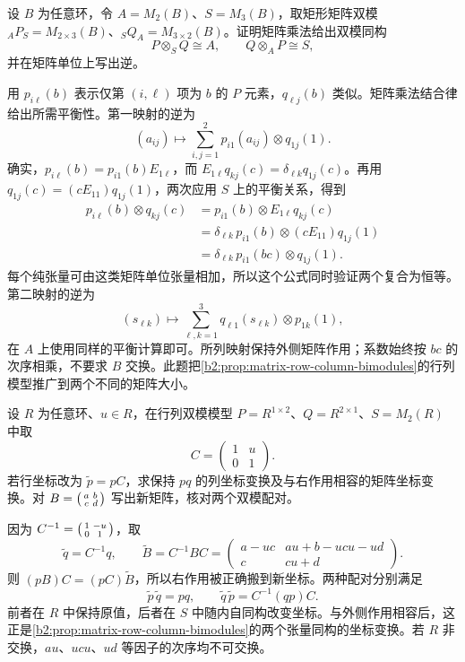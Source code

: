 \begin{exercise}\label{b2:ex:16-row-column-evaluation}
	设 \(B\) 为任意环，令 \(A=M_2(B)\)、\(S=M_3(B)\)，取矩形矩阵双模 \({}_AP_S=M_{2\times3}(B)\)、\({}_SQ_A=M_{3\times2}(B)\)。证明矩阵乘法给出双模同构
	\[
		P\otimes_SQ\cong A,\qquad Q\otimes_AP\cong S,
	\]
	并在矩阵单位上写出逆。
\end{exercise}
\begin{solution}
	用 \(p_{i\ell}(b)\) 表示仅第 \((i,\ell)\) 项为 \(b\) 的 \(P\) 元素，\(q_{\ell j}(b)\) 类似。矩阵乘法结合律给出所需平衡性。第一映射的逆为
	\[
		(a_{ij})\longmapsto\sum_{i,j=1}^2p_{i1}(a_{ij})\otimes q_{1j}(1).
	\]
	确实，\(p_{i\ell}(b)=p_{i1}(b)E_{1\ell}\)，而 \(E_{1\ell}q_{kj}(c)=\delta_{\ell k}q_{1j}(c)\)。再用 \(q_{1j}(c)=(cE_{11})q_{1j}(1)\)，两次应用 \(S\) 上的平衡关系，得到
	\[
		\begin{aligned}
			p_{i\ell}(b)\otimes q_{kj}(c) &=p_{i1}(b)\otimes E_{1\ell}q_{kj}(c)\\
			&=\delta_{\ell k}\,p_{i1}(b)\otimes(cE_{11})q_{1j}(1)\\
			&=\delta_{\ell k}\,p_{i1}(bc)\otimes q_{1j}(1).
		\end{aligned}
	\]
	每个纯张量可由这类矩阵单位张量相加，所以这个公式同时验证两个复合为恒等。第二映射的逆为
	\[
		(s_{\ell k})\longmapsto\sum_{\ell,k=1}^3q_{\ell1}(s_{\ell k})\otimes p_{1k}(1),
	\]
	在 \(A\) 上使用同样的平衡计算即可。所列映射保持外侧矩阵作用；系数始终按 \(bc\) 的次序相乘，不要求 \(B\) 交换。此题把\cref{b2:prop:matrix-row-column-bimodules}的行列模型推广到两个不同的矩阵大小。
\end{solution}

\begin{exercise}\label{b2:ex:16-dual-bimodule-pair}
	设 \(R\) 为任意环、\(u\in R\)，在行列双模模型 \(P=R^{1\times2}\)、\(Q=R^{2\times1}\)、\(S=M_2(R)\) 中取
	\[
		C=\begin{pmatrix}1&u\\0&1\end{pmatrix}.
	\]
	若行坐标改为 \(\widetilde p=pC\)，求保持 \(pq\) 的列坐标变换及与右作用相容的矩阵坐标变换。对 \(B=\begin{psmallmatrix}a&b\\c&d\end{psmallmatrix}\) 写出新矩阵，核对两个双模配对。
\end{exercise}
\begin{solution}
	因为 \(C^{-1}=\begin{psmallmatrix}1&-u\\0&1\end{psmallmatrix}\)，取
	\[
		\widetilde q=C^{-1}q,\qquad \widetilde B=C^{-1}BC
		=\begin{pmatrix}
			a-uc&au+b-ucu-ud\\
			c&cu+d
		\end{pmatrix}.
	\]
	则 \((pB)C=(pC)\widetilde B\)，所以右作用被正确搬到新坐标。两种配对分别满足
	\[
		\widetilde p\,\widetilde q=pq,\qquad \widetilde q\,\widetilde p=C^{-1}(qp)C.
	\]
	前者在 \(R\) 中保持原值，后者在 \(S\) 中随内自同构改变坐标。与外侧作用相容后，这正是\cref{b2:prop:matrix-row-column-bimodules}的两个张量同构的坐标变换。若 \(R\) 非交换，\(au\)、\(ucu\)、\(ud\) 等因子的次序均不可交换。
\end{solution}

